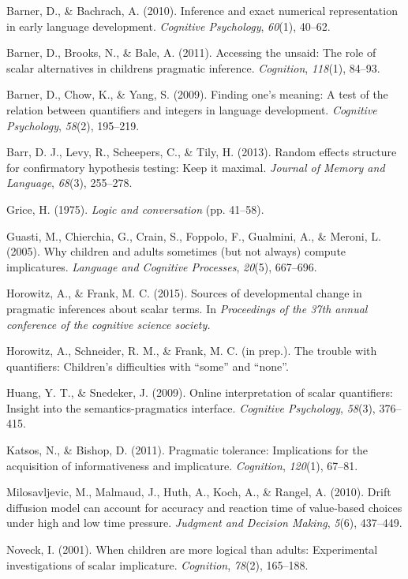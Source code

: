 \documentclass[10pt, letterpaper]{article}
\begin{document}
Barner, D., \& Bachrach, A. (2010). Inference and exact numerical
representation in early language development. \emph{Cognitive
Psychology}, \emph{60}(1), 40--62.

Barner, D., Brooks, N., \& Bale, A. (2011). Accessing the unsaid: The
role of scalar alternatives in childrens pragmatic inference.
\emph{Cognition}, \emph{118}(1), 84--93.

Barner, D., Chow, K., \& Yang, S. (2009). Finding one's meaning: A test
of the relation between quantifiers and integers in language
development. \emph{Cognitive Psychology}, \emph{58}(2), 195--219.

Barr, D. J., Levy, R., Scheepers, C., \& Tily, H. (2013). Random effects
structure for confirmatory hypothesis testing: Keep it maximal.
\emph{Journal of Memory and Language}, \emph{68}(3), 255--278.

Grice, H. (1975). \emph{Logic and conversation} (pp. 41--58).

Guasti, M., Chierchia, G., Crain, S., Foppolo, F., Gualmini, A., \&
Meroni, L. (2005). Why children and adults sometimes (but not always)
compute implicatures. \emph{Language and Cognitive Processes},
\emph{20}(5), 667--696.

Horowitz, A., \& Frank, M. C. (2015). Sources of developmental change in
pragmatic inferences about scalar terms. In \emph{Proceedings of the
37th annual conference of the cognitive science society.}

Horowitz, A., Schneider, R. M., \& Frank, M. C. (in prep.). The trouble
with quantifiers: Children's difficulties with ``some'' and ``none''.

Huang, Y. T., \& Snedeker, J. (2009). Online interpretation of scalar
quantifiers: Insight into the semantics-pragmatics interface.
\emph{Cognitive Psychology}, \emph{58}(3), 376--415.

Katsos, N., \& Bishop, D. (2011). Pragmatic tolerance: Implications for
the acquisition of informativeness and implicature. \emph{Cognition},
\emph{120}(1), 67--81.

Milosavljevic, M., Malmaud, J., Huth, A., Koch, A., \& Rangel, A.
(2010). Drift diffusion model can account for accuracy and reaction time
of value-based choices under high and low time pressure. \emph{Judgment
and Decision Making}, \emph{5}(6), 437--449.

Noveck, I. (2001). When children are more logical than adults:
Experimental investigations of scalar implicature. \emph{Cognition},
\emph{78}(2), 165--188.
\end{document}
